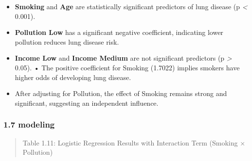 \begin{itemize}
\item
  \textbf{Smoking} and \textbf{Age} are statistically significant
  predictors of lung disease (p \emph{\textless{}} 0.001).
\item
  \textbf{Pollution Low} has a significant negative coefficient,
  indicating lower pollution reduces lung disease risk.
\item
  \textbf{Income Low} and \textbf{Income Medium} are not significant
  predictors (p \emph{\textgreater{}} 0.05). • The positive coefficient
  for Smoking (1.7022) implies smokers have higher odds of developing
  lung disease.
\item
  After adjusting for Pollution, the effect of Smoking remains strong
  and significant, suggesting an independent influence.
\end{itemize}

\subsubsection{1.7 modeling}\label{modeling}

\begin{quote}
Table 1.11: Logistic Regression Results with Interaction Term (Smoking ×
Pollution)
\end{quote}

